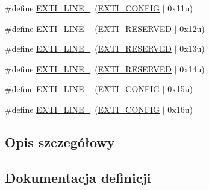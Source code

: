 \begin{DoxyCompactItemize}
\item 
\#define \hyperlink{group___e_x_t_i___line_ga9d09e51fda52def20bd23a0c42da3014}{E\+X\+T\+I\+\_\+\+L\+I\+N\+E\+\_}~(\hyperlink{group___e_x_t_i___private___constants_ga6f245ca02e17c1798fe43a66ea5b7fa4}{E\+X\+T\+I\+\_\+\+C\+O\+N\+F\+IG}     $\vert$ 0x11u)
\item 
\#define \hyperlink{group___e_x_t_i___line_ga8f420801658edbe81973c670ed97913e}{E\+X\+T\+I\+\_\+\+L\+I\+N\+E\+\_}~(\hyperlink{group___e_x_t_i___private___constants_gac15c8e004a79171f659e6cba49e8a57a}{E\+X\+T\+I\+\_\+\+R\+E\+S\+E\+R\+V\+ED}   $\vert$ 0x12u)
\item 
\#define \hyperlink{group___e_x_t_i___line_gaa69d86266839e0980ad222192760c760}{E\+X\+T\+I\+\_\+\+L\+I\+N\+E\+\_}~(\hyperlink{group___e_x_t_i___private___constants_gac15c8e004a79171f659e6cba49e8a57a}{E\+X\+T\+I\+\_\+\+R\+E\+S\+E\+R\+V\+ED}   $\vert$ 0x13u)
\item 
\#define \hyperlink{group___e_x_t_i___line_ga1d35577fb74cdbf58431570bd763f615}{E\+X\+T\+I\+\_\+\+L\+I\+N\+E\+\_}~(\hyperlink{group___e_x_t_i___private___constants_gac15c8e004a79171f659e6cba49e8a57a}{E\+X\+T\+I\+\_\+\+R\+E\+S\+E\+R\+V\+ED}   $\vert$ 0x14u)
\item 
\#define \hyperlink{group___e_x_t_i___line_gaae9d458581e656ab574d6d56b9844587}{E\+X\+T\+I\+\_\+\+L\+I\+N\+E\+\_}~(\hyperlink{group___e_x_t_i___private___constants_ga6f245ca02e17c1798fe43a66ea5b7fa4}{E\+X\+T\+I\+\_\+\+C\+O\+N\+F\+IG}     $\vert$ 0x15u)
\item 
\#define \hyperlink{group___e_x_t_i___line_gacf5c5aed8ca5e9a3a3128d314cbe1f7f}{E\+X\+T\+I\+\_\+\+L\+I\+N\+E\+\_}~(\hyperlink{group___e_x_t_i___private___constants_ga6f245ca02e17c1798fe43a66ea5b7fa4}{E\+X\+T\+I\+\_\+\+C\+O\+N\+F\+IG}     $\vert$ 0x16u)
\end{DoxyCompactItemize}


\subsection{Opis szczegółowy}


\subsection{Dokumentacja definicji}
\mbox{\label{group___e_x_t_i___line_gac1a9cd58d76e9f497abecc832e3294c8}} 
